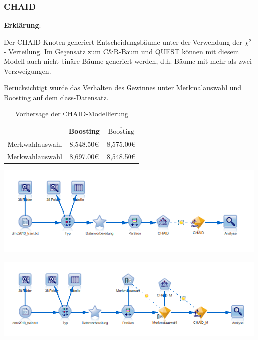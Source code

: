 \documentclass[a4paper,12pt]{article}
\begin{document}
\subsubsection{CHAID}
{\bf Erklärung}:
\par
\vspace{0.2cm}
Der CHAID-Knoten generiert Entscheidungsbäume unter der Verwendung der $\chi^2$  - Verteilung.
Im Gegensatz zum C\&R-Baum  und QUEST können mit diesem Modell auch nicht binäre Bäume generiert werden, d.h. Bäume mit mehr als zwei
Verzweigungen. 
\par
\vspace{0.2cm}
Berücksichtigt wurde das Verhalten des Gewinnes unter Merkmalauswahl und Boosting auf dem class-Datensatz. 

\begin{table}[h]
\begin{center}
\begin{tabular}{ c | c | c }
 & Boosting & $\overline{\text{Boosting}}$
\\
\hline
Merkwahlauswahl  &  8,548.50\;\euro & 8,575.00\;\euro
\\
$\overline{\text{Merkwahlauswahl}}$ & 8,697.00\;\euro  &  8,548.50\;\euro
\\
\end{tabular}
\caption{Vorhersage der CHAID-Modellierung}
\end{center}
\end{table}

\begin{center}
\includegraphics[width=\textwidth]{Screens/chaid}
\end{center}

\begin{center}
\includegraphics[width=\textwidth]{Screens/chaid_m}
\end{center}
\end{document}
